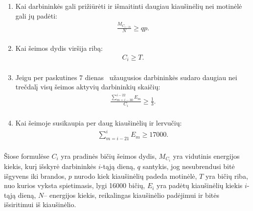 \documentclass{VUMIFPSmagistrinis}
\begin{document}
\begin{enumerate}
\item Kai darbinink\.es gali pri\v{z}i\=ur\.eti ir i\v{s}maitinti daugiau kiau\v{s}in\.eli\k{u} nei motin\.el\.e gali j\k{u} pad\.eti:
\begin{equation}
\label{ebpss1}
\begin{matrix}\frac{M_{C_{i-21}}} N{\geq}\mathit{qp.}\\\end{matrix}
\end{equation}

\item Kai \v{s}eimos dydis vir\v{s}ija rib\k{a}:
\begin{equation}\label{ebpss2}
\begin{matrix}C_i{\geq}\mathit{T.}\\\end{matrix}
\end{equation}

\item Jeigu per paskutines 7 dienas \ u\v{z}augusios darbinink\.es sudaro daugiau nei tre\v{c}dal\k{i} visų \v{s}eimos aktyvi\k{u} darbininki\k{u} skai\v{c}i\k{u}:
\begin{equation}\label{ebpss3}
\begin{matrix}\frac{\sum _{m=i-30}^{i-22}E_m}{C_i}{\geq}\frac 1 3.\\\end{matrix}
\end{equation}

\item Kai \v{s}eimoje susikaupia per daug kiau\v{s}in\.eli\k{u} ir lervučių:
\begin{equation}\label{ebpss4}
\begin{matrix}\sum _{m=i-21}^iE_m{\geq}17000.\\\end{matrix}
\end{equation}
\end{enumerate}


Šiose formulėse $C_{i}$ yra pradinės bičių šeimos dydis, $M_{C_{i}}$ yra vidutinis energijos kiekis, kurį išskyrė darbininkės $i$-tąją dieną,  $q$ santykis, jog nesubrendusi bitė išgyvens iki brandos, $p$ nurodo kiek kiaušinėlių padeda motinėlė, $T$ yra bičių riba, nuo kurios vyksta spietimasis, lygi 16000 bičių, $E_{i}$ yra padėtų kiaušinėlių kiekis $i$-tąją dieną, $N$-- energijos kiekis, reikalingas kiaušinėlio padėjimui ir bitės išsiritimui iš kiaušinėlio. 
\end{document}
